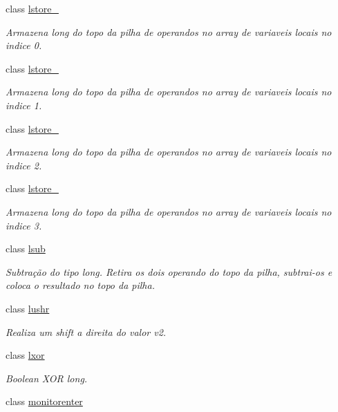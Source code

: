 \begin{DoxyCompactItemize}
class \hyperlink{class_instruction_impl_1_1lstore__0}{lstore\+\_}
\begin{DoxyCompactList}\small\item\em Armazena long do topo da pilha de operandos no array de variaveis locais no indice 0. \end{DoxyCompactList}\item 
class \hyperlink{class_instruction_impl_1_1lstore__1}{lstore\+\_}
\begin{DoxyCompactList}\small\item\em Armazena long do topo da pilha de operandos no array de variaveis locais no indice 1. \end{DoxyCompactList}\item 
class \hyperlink{class_instruction_impl_1_1lstore__2}{lstore\+\_}
\begin{DoxyCompactList}\small\item\em Armazena long do topo da pilha de operandos no array de variaveis locais no indice 2. \end{DoxyCompactList}\item 
class \hyperlink{class_instruction_impl_1_1lstore__3}{lstore\+\_}
\begin{DoxyCompactList}\small\item\em Armazena long do topo da pilha de operandos no array de variaveis locais no indice 3. \end{DoxyCompactList}\item 
class \hyperlink{class_instruction_impl_1_1lsub}{lsub}
\begin{DoxyCompactList}\small\item\em Subtração do tipo long. Retira os dois operando do topo da pilha, subtrai-\/os e coloca o resultado no topo da pilha. \end{DoxyCompactList}\item 
class \hyperlink{class_instruction_impl_1_1lushr}{lushr}
\begin{DoxyCompactList}\small\item\em Realiza um shift a direita do valor v2. \end{DoxyCompactList}\item 
class \hyperlink{class_instruction_impl_1_1lxor}{lxor}
\begin{DoxyCompactList}\small\item\em Boolean X\+OR long. \end{DoxyCompactList}\item 
class \hyperlink{class_instruction_impl_1_1monitorenter}{monitorenter}

\end{DoxyCompactItemize}

